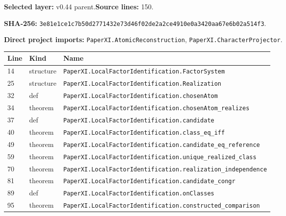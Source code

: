 \documentclass[10pt,oneside]{book}
\begin{document}
\textbf{Selected layer:} v0.44 parent.\quad\textbf{Source lines:} 150.\par\textbf{SHA-256:} {\scriptsize\nolinkurl{3e81e1ce1c7b50d2771432e73d46f02de2a2ce4910e0a3420aa67e6b02a514f3}}.


\textbf{Direct project imports:} \nolinkurl{PaperXI.AtomicReconstruction}, \nolinkurl{PaperXI.CharacterProjector}.

\begin{longtable}{@{}p{}p{}p{}@{}}\toprule Line&Kind&Name\\\midrule\endhead

14&structure&\nolinkurl{PaperXI.LocalFactorIdentification.FactorSystem}\\

25&structure&\nolinkurl{PaperXI.LocalFactorIdentification.Realization}\\

32&def&\nolinkurl{PaperXI.LocalFactorIdentification.chosenAtom}\\

34&theorem&\nolinkurl{PaperXI.LocalFactorIdentification.chosenAtom_realizes}\\

37&def&\nolinkurl{PaperXI.LocalFactorIdentification.candidate}\\

40&theorem&\nolinkurl{PaperXI.LocalFactorIdentification.class_eq_iff}\\

49&theorem&\nolinkurl{PaperXI.LocalFactorIdentification.candidate_eq_reference}\\

59&theorem&\nolinkurl{PaperXI.LocalFactorIdentification.unique_realized_class}\\

70&theorem&\nolinkurl{PaperXI.LocalFactorIdentification.realization_independence}\\

81&theorem&\nolinkurl{PaperXI.LocalFactorIdentification.candidate_congr}\\

89&def&\nolinkurl{PaperXI.LocalFactorIdentification.onClasses}\\

95&theorem&\nolinkurl{PaperXI.LocalFactorIdentification.constructed_comparison}\\


\end{longtable}
\end{document}
